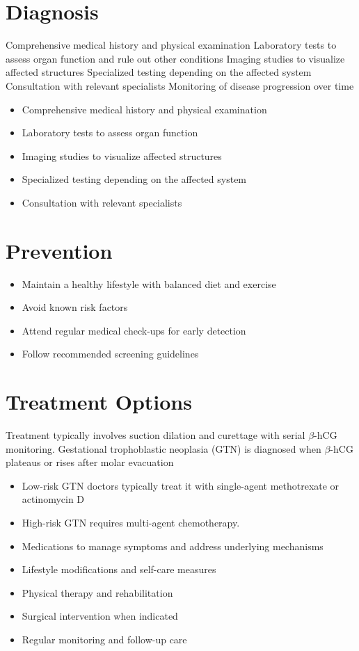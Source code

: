 \section{Diagnosis}
Comprehensive medical history and physical examination Laboratory tests to assess organ function and rule out other conditions Imaging studies to visualize affected structures Specialized testing depending on the affected system Consultation with relevant specialists Monitoring of disease progression over time

\begin{itemize}[noitemsep]
  \item Comprehensive medical history and physical examination
  \item Laboratory tests to assess organ function
  \item Imaging studies to visualize affected structures
  \item Specialized testing depending on the affected system
  \item Consultation with relevant specialists
\end{itemize}
\section{Prevention}
\begin{itemize}[noitemsep]
  \item Maintain a healthy lifestyle with balanced diet and exercise
  \item Avoid known risk factors
  \item Attend regular medical check-ups for early detection
  \item Follow recommended screening guidelines
\end{itemize}
\section{Treatment Options}
Treatment typically involves suction dilation and curettage with serial $\beta$-hCG monitoring. Gestational trophoblastic neoplasia (GTN) is diagnosed when $\beta$-hCG plateaus or rises after molar evacuation

\begin{itemize}[noitemsep]
  \item Low-risk GTN doctors typically treat it with single-agent methotrexate or actinomycin D
  \item High-risk GTN requires multi-agent chemotherapy.
  \item Medications to manage symptoms and address underlying mechanisms
  \item Lifestyle modifications and self-care measures
  \item Physical therapy and rehabilitation
  \item Surgical intervention when indicated
  \item Regular monitoring and follow-up care
\end{itemize}
